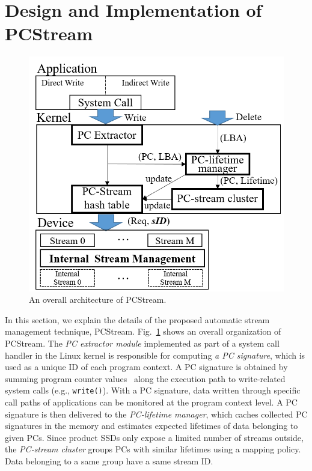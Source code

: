 \section{Design and Implementation of \textsf{PCStream}}

\begin{figure}[t]
	\centering
	\includegraphics[width=0.6\linewidth]{figure/overview}
	\caption{An overall architecture of \textsf{\small PCStream}.}
	\label{fig:architecture}
\end{figure}

In this section, we explain the details of the proposed automatic stream
management technique, \textsf{\small PCStream}.
Fig.~\ref{fig:architecture} shows an overall organization of \textsf{\small
PCStream}. The \textit{PC extractor module} implemented as part of a system
call handler in the Linux kernel is responsible for computing \textit{a PC
signature}, which is used as a unique ID of each program context.  A PC
signature is obtained by summing program counter values~\cite{PC} along the
execution path to write-related system calls (e.g., {\tt write()}).  With a PC
signature, data written through specific call paths of applications can be
monitored at the program context level.  A PC signature is then delivered to
the \textit{PC-lifetime manager}, which caches collected PC signatures in the
memory and estimates expected lifetimes of data belonging to given PCs.  Since
product SSDs only expose a limited number of streams outside, the
\textit{PC-stream cluster} groups PCs with similar lifetimes using a mapping
policy. Data belonging to a same group have a same stream ID.

